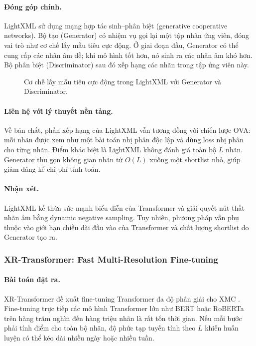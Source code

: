\paragraph{Đóng góp chính.}
LightXML sử dụng mạng hợp tác sinh--phân biệt (generative cooperative networks). Bộ tạo (Generator) có nhiệm vụ gọi lại một tập nhãn ứng viên, đóng vai trò như cơ chế lấy mẫu tiêu cực động. Ở giai đoạn đầu, Generator có thể cung cấp các nhãn âm dễ; khi mô hình tốt hơn, nó sinh ra các nhãn âm khó hơn. Bộ phân biệt (Discriminator) sau đó xếp hạng các nhãn trong tập ứng viên này.
\begin{figure}[H]
\centering
\resizebox{0.98\textwidth}{!}{}
\caption{Cơ chế lấy mẫu tiêu cực động trong LightXML với Generator và Discriminator.}
\label{fig:xmc-lightxml}
\end{figure}


\paragraph{Liên hệ với lý thuyết nền tảng.}
Về bản chất, phần xếp hạng của LightXML vẫn tương đồng với chiến lược OVA: mỗi nhãn được xem như một bài toán nhị phân độc lập và dùng loss nhị phân cho từng nhãn. Điểm khác biệt là LightXML không đánh giá toàn bộ $L$ nhãn. Generator thu gọn không gian nhãn từ $O(L)$ xuống một shortlist nhỏ, giúp giảm đáng kể chi phí tính toán.

\paragraph{Nhận xét.}
LightXML kế thừa sức mạnh biểu diễn của Transformer và giải quyết nút thắt nhãn âm bằng dynamic negative sampling. Tuy nhiên, phương pháp vẫn phụ thuộc vào giới hạn chiều dài đầu vào của Transformer và chất lượng shortlist do Generator tạo ra.

\subsubsection{XR-Transformer: Fast Multi-Resolution Fine-tuning}

\paragraph{Bài toán đặt ra.} XR-Transformer đề xuất fine-tuning Transformer đa độ phân giải cho XMC \cite{zhang2021xrtransformer}.
Fine-tuning trực tiếp các mô hình Transformer lớn như BERT hoặc RoBERTa trên hàng trăm nghìn đến hàng triệu nhãn là rất tốn thời gian. Nếu mỗi bước phải tính điểm cho toàn bộ nhãn, độ phức tạp tuyến tính theo $L$ khiến huấn luyện có thể kéo dài nhiều ngày hoặc nhiều tuần.

